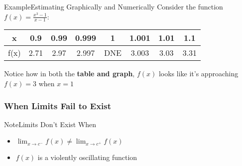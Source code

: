 \documentclass{MathNotes}
\newenvironment{example}[1]{\begin{BlueBox}{Example}{#1}}{\end{BlueBox}}
\newenvironment{note}[1]{\begin{YellowBox}{Note}{#1}}{\end{YellowBox}}
\begin{document}
\begin{example}{Estimating Graphically and Numerically}\label{ex:1.1}
    Consider the function $f(x)=\frac{x^3-1}{x-1}$:
    \begin{center}

        \begin{tabular}{ |c||c|c|c|c|c|c|c| }
            \hline
            x    & 0.9 & 0.99 & 0.999 & 1 & 1.001 & 1.01 & 1.1\\
            \hline
            f(x) & 2.71 & 2.97 & 2.997 &DNE& 3.003 & 3.03 & 3.31 \\
            \hline
        \end{tabular}
    \end{center}

    Notice how in both the \textbf{table and graph}, $f(x)$ looks like it's
    approaching $f(x)=3$ when $x=1$
\end{example}

\subsubsection{When Limits Fail to Exist}
\begin{note}{Limits Don't Exist When}
    \begin{itemize}
        \item $\lim_{x\to c^-}f(x)\neq \lim_{x\to c^+}f(x)$
        \item $f(x)$ is a violently oscillating function
    \end{itemize}
\end{note}
\end{document}
